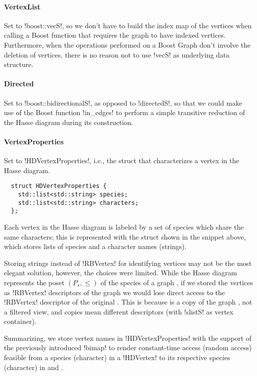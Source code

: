 \paragraph{VertexList}

Set to !boost::vecS!, so we don't have to build the index map of the vertices when calling a Boost function that requires the graph to have indexed vertices.
Furthermore, when the operations performed on a Boost Graph don't involve the deletion of vertices, there is no reason not to use !vecS! as underlying data structure.

\paragraph{Directed}

Set to !boost::bidirectionalS!, as opposed to !directedS!, so that we could make use of the Boost function !in_edges! to perform a simple transitive reduction of the Hasse diagram during its construction.

\paragraph{VertexProperties}

Set to !HDVertexProperties!, i.e., the struct that characterizes a vertex in the Hasse diagram.

\begin{lstlisting}
  struct HDVertexProperties {
    std::list<std::string> species;
    std::list<std::string> characters;
  };
\end{lstlisting}

Each vertex in the Hasse diagram is labeled by a set of species which share the same characters; this is represented with the struct shown in the snippet above, which stores lists of species and a character names (strings).

Storing strings instead of !RBVertex! for identifying vertices may not be the most elegant solution, however, the choices were limited.
While the Hasse diagram represents the poset $(P_{s}, \leq)$ of the species of a graph \grbcm{}, if we stored the vertices as !RBVertex! descriptors of the graph \grbcm{} we would lose direct access to the !RBVertex! descriptor of the original \grb{}.
This is because \grbcm{} is a copy of the graph \grb{}, not a filtered view, and copies mean different descriptors (with !slistS! as vertex container).

Summarizing, we store vertex names in !HDVertexProperties! \textendash{} with the support of the previously introduced !bimap! \textendash{} to render constant-time access (random access) feasible from a species (character) in a !HDVertex! to its respective species (character) in \grb{} and \grbcm{}.

